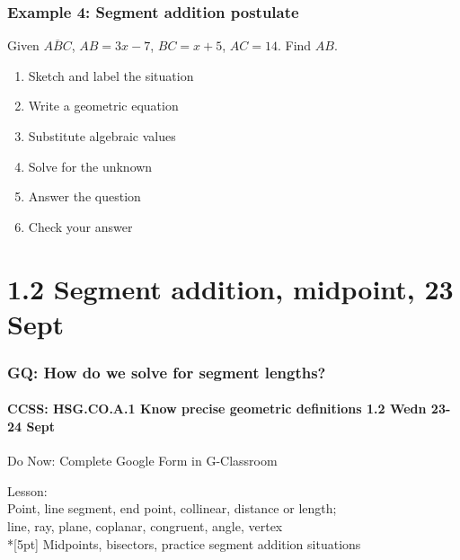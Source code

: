 \documentclass{beamer}
\begin{document}
  \frame
  {
    \frametitle{Example 4: Segment addition postulate}
    
    Given $\overline{ABC}$, $AB=3x-7$, $BC=x+5$, $AC=14$. Find ${AB}$.\\[0.5in]
        \vspace{1cm}
  \begin{enumerate}
      \item<2-> Sketch and label the situation\\
      \item<2-> Write a geometric equation\\
      \item<2-> Substitute algebraic values\\
      \item<2-> Solve for the unknown\\
      \item<2-> Answer the question\\
      \item<2-> Check your answer
    \end{enumerate}
  }

  \section{1.2 Segment addition, midpoint, 23 Sept}
  \frame
  {
    \frametitle{GQ: How do we solve for segment lengths?}
    \framesubtitle{CCSS: HSG.CO.A.1 Know precise geometric definitions  \hfill \alert{1.2 Wedn 23-24 Sept}}
  
    \begin{block}{Do Now: Complete Google Form in G-Classroom}
    \end{block}
    Lesson: \\ Point, line segment, end point, collinear, distance or length; \\ line, ray, plane, coplanar, congruent, angle, vertex \\*[5pt]
    Midpoints, bisectors, practice segment addition situations
  }
\end{document}
